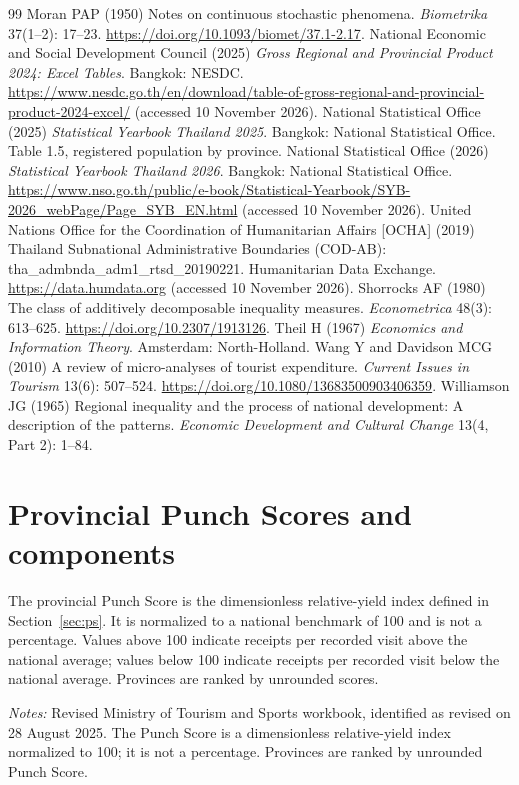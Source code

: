 \documentclass[11pt,a4paper]{article}
\begin{document}
\begin{thebibliography}{99}
 Moran PAP (1950) Notes on continuous stochastic phenomena. \emph{Biometrika} 37(1--2): 17--23. \url{https://doi.org/10.1093/biomet/37.1-2.17}.
 National Economic and Social Development Council (2025) \emph{Gross Regional and Provincial Product 2024: Excel Tables}. Bangkok: NESDC. \url{https://www.nesdc.go.th/en/download/table-of-gross-regional-and-provincial-product-2024-excel/} (accessed 10 November 2026).
 National Statistical Office (2025) \emph{Statistical Yearbook Thailand 2025}. Bangkok: National Statistical Office. Table 1.5, registered population by province.
 National Statistical Office (2026) \emph{Statistical Yearbook Thailand 2026}. Bangkok: National Statistical Office. \url{https://www.nso.go.th/public/e-book/Statistical-Yearbook/SYB-2026_webPage/Page_SYB_EN.html} (accessed 10 November 2026).
 United Nations Office for the Coordination of Humanitarian Affairs [OCHA] (2019) Thailand Subnational Administrative Boundaries (COD-AB): tha\_admbnda\_adm1\_rtsd\_20190221. Humanitarian Data Exchange. \url{https://data.humdata.org} (accessed 10 November 2026).
 Shorrocks AF (1980) The class of additively decomposable inequality measures. \emph{Econometrica} 48(3): 613--625. \url{https://doi.org/10.2307/1913126}.
 Theil H (1967) \emph{Economics and Information Theory}. Amsterdam: North-Holland.
 Wang Y and Davidson MCG (2010) A review of micro-analyses of tourist expenditure. \emph{Current Issues in Tourism} 13(6): 507--524. \url{https://doi.org/10.1080/13683500903406359}.
 Williamson JG (1965) Regional inequality and the process of national development: A description of the patterns. \emph{Economic Development and Cultural Change} 13(4, Part 2): 1--84.
\end{thebibliography}

\appendix
\section{Provincial Punch Scores and components}
The provincial Punch Score is the dimensionless relative-yield index defined in Section~\ref{sec:ps}. It is normalized to a national benchmark of 100 and is not a percentage. Values above 100 indicate receipts per recorded visit above the national average; values below 100 indicate receipts per recorded visit below the national average. Provinces are ranked by unrounded scores.
\begin{center}\scriptsize
{}\label{tab:all}

\end{center}
{\scriptsize\emph{Notes:} Revised Ministry of Tourism and Sports workbook, identified as revised on 28 August 2025. The Punch Score is a dimensionless relative-yield index normalized to 100; it is not a percentage. Provinces are ranked by unrounded Punch Score.}
\end{document}
